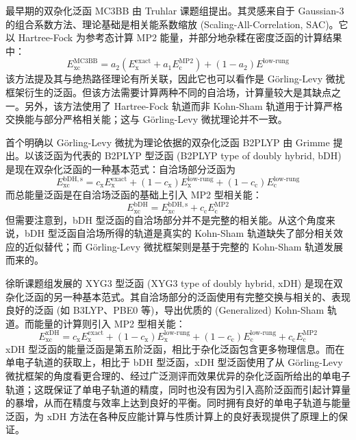 最早期的双杂化泛函 MC3BB 由 Truhlar 课题组提出\cite{Zhao-Truhlar.JPCA.2004}。其灵感来自于 Gaussian-3\cite{Curtiss-Pople.JCP.1998, Curtiss-Pople.JCP.2000} 的组合系数方法、理论基础是相关能系数缩放 (Scaling-All-Correlation, SAC)\cite{Gordon-Truhlar.JACS.1986}。它以 Hartree-Fock 为参考态计算 MP2 能量，并部分地杂糅在密度泛函的计算结果中：
\begin{equation}
  E_\mathrm{xc}^\mathrm{MC3BB} = a_2 (E_\mathrm{x}^\mathrm{exact} + a_1 E_\mathrm{c}^\mathrm{MP2}) + (1 - a_2) E^\text{low-rung}
\end{equation}
该方法提及其与绝热路径理论有所关联，因此它也可以看作是 G\"{o}rling-Levy 微扰框架衍生的泛函。但该方法需要计算两种不同的自洽场，计算量较大是其缺点之一。另外，该方法使用了 Hartree-Fock 轨道而非 Kohn-Sham 轨道用于计算严格交换能与部分严格相关能；这与 G\"{o}rling-Levy 微扰理论并不一致。

首个明确以 G\"{o}rling-Levy 微扰为理论依据的双杂化泛函 B2PLYP 由 Grimme 提出\cite{Grimme-Grimme.JCP.2006}。以该泛函为代表的 B2PLYP 型泛函 (B2PLYP type of doubly hybrid, bDH) 是现在双杂化泛函的一种基本范式：自洽场部分泛函为
\begin{equation}
  E_\mathrm{xc}^\mathrm{bDH, s} = c_\mathrm{x} E_\mathrm{x}^\mathrm{exact} + (1 - c_\mathrm{x}) E_\mathrm{x}^\text{low-rung} + (1 - c_\mathrm{c}) E_\mathrm{c}^\text{low-rung}
\end{equation}
而总能量泛函是在自洽场泛函的基础上引入 MP2 型相关能：
\begin{equation}
  E_\mathrm{xc}^\mathrm{bDH} = E_\mathrm{xc}^\mathrm{bDH, s} + c_\mathrm{c} E_\mathrm{c}^\mathrm{MP2}
\end{equation}
但需要注意到，bDH 型泛函的自洽场部分并不是完整的相关能。从这个角度来说，bDH 型泛函自洽场所得的轨道是真实的 Kohn-Sham 轨道缺失了部分相关效应的近似替代；而 G\"{o}rling-Levy 微扰框架则是基于完整的 Kohn-Sham 轨道发展而来的。

徐昕课题组发展的 XYG3 型泛函 (XYG3 type of doubly hybrid, xDH)\cite{Zhang-Goddard.PNAS.2009} 是现在双杂化泛函的另一种基本范式。其自洽场部分的泛函使用有完整交换与相关的、表现良好的泛函 (如 B3LYP、PBE0 等)，导出优质的 (Generalized) Kohn-Sham 轨道。而能量的计算则引入 MP2 型相关能：
\begin{equation}
  E_\mathrm{xc}^\mathrm{xDH} = c_\mathrm{x} E_\mathrm{x}^\mathrm{exact} + (1 - c_\mathrm{x}) E_\mathrm{x}^\text{low-rung} + (1 - c_\mathrm{c}) E_\mathrm{c}^\text{low-rung} + c_\mathrm{c} E_\mathrm{c}^\mathrm{MP2}
\end{equation}
xDH 型泛函的能量泛函是第五阶泛函，相比于杂化泛函包含更多物理信息。而在单电子轨道的获取上，相比于 bDH 型泛函，xDH 型泛函使用了从 G\"{o}rling-Levy 微扰框架的角度看更合理的、经过广泛测评而效果优异的杂化泛函所给出的单电子轨道；这既保证了单电子轨道的精度，同时也没有因为引入高阶泛函而引起计算量的暴增，从而在精度与效率上达到良好的平衡。同时拥有良好的单电子轨道与能量泛函，为 xDH 方法在各种反应能计算与性质计算上的良好表现提供了原理上的保证。


